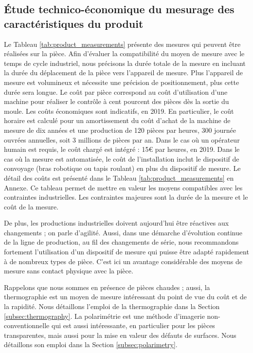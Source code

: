 \subsection{Étude technico-économique du mesurage des caractéristiques du produit}
Le Tableau \ref{tab:product_measurements} présente des mesures qui peuvent être réalisées sur la pièce.
Afin d'évaluer la compatibilité du moyen de mesure avec le temps de cycle industriel, nous précisons la durée totale de la mesure en incluant la durée du déplacement de la pièce vers l'appareil de mesure.
Plus l'appareil de mesure est volumineux et nécessite une précision de positionnement, plus cette durée sera longue.
Le coût par pièce correspond au coût d'utilisation d'une machine pour réaliser le contrôle à cent pourcent des pièces dès la sortie du moule.
Les coûts économiques sont indicatifs, en 2019.
En particulier, le coût horaire est calculé pour un amortissement du coût d'achat de la machine de mesure de dix années et une production de 120 pièces par heures, 300 journée ouvrées annuelles, soit 3 millions de pièces par an.
Dans le cas où un opérateur humain est requis, le coût chargé est intégré : 15€ par heures, en 2019.
Dans le cas où la mesure est automatisée, le coût de l'installation inclut le dispositif de convoyage (bras robotique ou tapis roulant) en plus du dispositif de mesure.
Le détail des coûts est présenté dans le Tableau \ref{tab:product_measurements} en Annexe.
Ce tableau permet de mettre en valeur les moyens compatibles avec les contraintes industrielles.
Les contraintes majeures sont la durée de la mesure et le coût de la mesure.

De plus, les productions industrielles doivent aujourd'hui être réactives aux changements ; on parle d'agilité.
Aussi, dans une démarche d'évolution continue de la ligne de production, au fil des changements de série, nous recommandons fortement l'utilisation d'un dispositif de mesure qui puisse être adapté rapidement à de nombreux types de pièce.
C'est ici un avantage considérable des moyens de mesure sans contact physique avec la pièce.

Rappelons que nous sommes en présence de pièces chaudes ; aussi, la thermographie est un moyen de mesure intéressant du point de vue du coût et de la rapidité.
Nous détaillons l'emploi de la thermographie dans la Section \ref{subsec:thermography}.
La polarimétrie est une méthode d'imagerie non-conventionnelle qui est aussi intéressante, en particulier pour les pièces transparentes, mais aussi pour la mise en valeur des défauts de surfaces.
Nous détaillons son emploi dans la Section \ref{subsec:polarimetry}.

